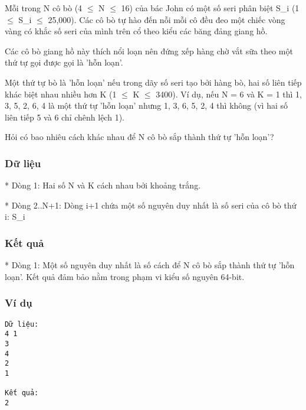 



   Mỗi trong N cô bò (4  $\le$  N  $\le$  16) của bác John có một số seri phân biệt S\_i (1  $\le$  S\_i  $\le$  25,000). Các cô bò tự hào đến nỗi mỗi cô đều đeo một chiếc vòng vàng có khắc số seri của mình trên cổ theo kiểu các băng đảng giang hồ.  

   Các cô bò giang hồ này thích nổi loạn nên đứng xếp hàng chờ vắt sữa theo một thứ tự gọi được gọi là 'hỗn loạn'.  

   Một thứ tự bò là 'hỗn loạn' nếu trong dãy số seri tạo bởi hàng bò, hai số liên tiếp khác biệt nhau nhiều hơn K (1  $\le$  K  $\le$  3400). Ví dụ, nếu N = 6 và K = 1 thì 1, 3, 5, 2, 6, 4 là một thứ tự 'hỗn loạn' nhưng 1, 3, 6, 5, 2, 4 thì không (vì hai số liên tiếp 5 và 6 chỉ chênh lệch 1).  

   Hỏi có bao nhiêu cách khác nhau để N cô bò sắp thành thứ tự 'hỗn loạn'?  

\subsubsection{   Dữ liệu  }

   * Dòng 1: Hai số N và K cách nhau bởi khoảng trắng.  

   * Dòng 2..N+1: Dòng i+1 chứa một số nguyên duy nhất là số seri của cô bò thứ i: S\_i  

\subsubsection{   Kết quả  }

   * Dòng 1: Một số nguyên duy nhất là số cách để N cô bò sắp thành thứ tự 'hỗn loạn'. Kết quả đảm bảo nằm trong phạm vi kiểu số nguyên 64-bit.  

\subsubsection{   Ví dụ  }
\begin{verbatim}
Dữ liệu:
4 1
3
4
2
1

Kết quả:
2
\end{verbatim}
